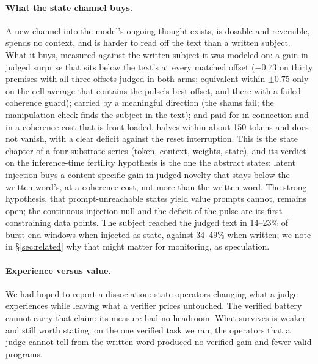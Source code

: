 \documentclass[11pt]{article}
\begin{document}
\paragraph{What the state channel buys.} A new channel into the
model's ongoing thought exists, is dosable and reversible, spends no
context, and is harder to read off the text than a written subject.
What it buys, measured against the written subject it was modeled on:
a gain in judged surprise that sits below the text's at every matched
offset ($-0.73$ on thirty premises with all three offsets judged in both
arms; equivalent within $\pm0.75$ only on the cell average that
contains the pulse's best offset, and there with a failed coherence
guard); carried by a meaningful direction (the shams fail; the
manipulation check finds the subject in the text); and paid for in
connection and in a coherence cost that is front-loaded, halves within
about 150 tokens and does not vanish, with a clear deficit against the
reset interruption. This is the state chapter of a four-substrate
series (token, context, weights, state), and its verdict on the
inference-time fertility hypothesis is the one the abstract states:
latent injection buys a content-specific gain in judged novelty that
stays below the written word's, at a coherence cost, not more than the
written word. The strong hypothesis, that prompt-unreachable states
yield value prompts cannot, remains open; the continuous-injection
null and the deficit of the pulse are its first constraining data
points. The subject reached the judged text in 14--23\% of burst-end
windows when injected as state, against 34--49\% when written; we note
in \S\ref{sec:related} why that might matter for monitoring, as
speculation.

\paragraph{Experience versus value.} We had hoped to report a
dissociation: state operators changing what a judge experiences
while leaving what a verifier prices untouched. The verified battery
cannot carry that claim: its measure had no headroom. What survives is
weaker and still worth stating: on the one verified task we ran, the
operators that a judge cannot tell from the written word produced no
verified gain and fewer valid programs.
\end{document}
